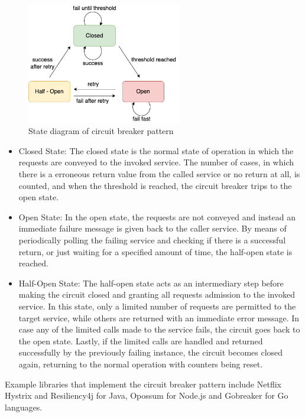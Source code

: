 \documentclass{Configuration_Files/PoliMi3i_thesis}
\begin{document}
\begin{figure}[H]
\centering
\includegraphics[width=0.60\textwidth]{myImages/circuit.png}
\caption{State diagram of circuit breaker pattern}
\label{fig:circuit_breaker}
\end{figure}

\begin{itemize}
    \item Closed State: The closed state is the normal state of operation in which the requests are conveyed to the invoked service. The number of cases, in which there is a erroneous return value from the called service or no return at all, is counted, and when the threshold is reached, the circuit breaker trips to the open state.
    
    \item Open State: In the open state, the requests are not conveyed and instead an immediate failure message is given back to the caller service. By means of periodically polling the failing service and checking if there is a successful return, or just waiting for a specified amount of time, the half-open state is reached.
    
    \item Half-Open State: The half-open state acts as an intermediary step before making the circuit closed and granting all requests admission to the invoked service. In this state, only a limited number of requests are permitted to the target service, while others are returned with an immediate error message. In case any of the limited calls made to the service fails, the circuit goes back to the open state. Lastly, if the limited calls are handled and returned successfully by the previously failing instance, the circuit becomes closed again, returning to the normal operation with counters being reset.
\end{itemize}

Example libraries that implement the circuit breaker pattern include Netflix Hystrix and Resiliency4j for Java, Opossum for Node.js and Gobreaker for Go languages.
\end{document}

